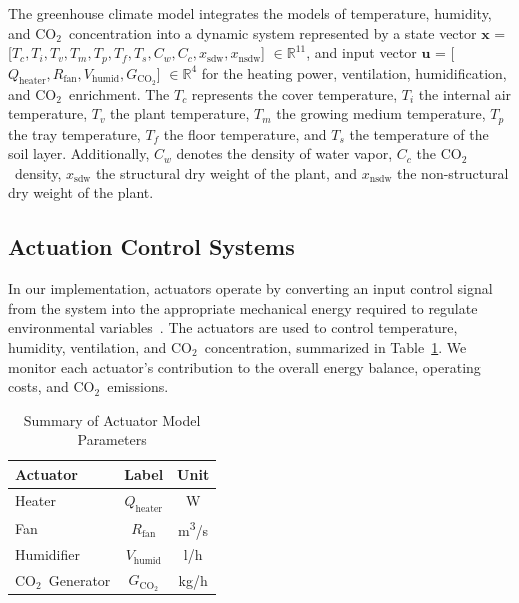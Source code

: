 \documentclass[conference]{IEEEtran}
\newcommand{\coo}{\ensuremath{\mathrm{CO_2}}}
\begin{document}
The greenhouse climate model integrates the models of temperature, humidity, and \coo\ concentration into a dynamic system represented by a state vector \(\mathbf{x}\) = [\(T_c, T_i, T_v, T_m, T_p, T_f, T_s, C_w, C_c, x_{\text{sdw}}, x_{\text{nsdw}}\)] \( \in\mathbb R^{11} \), and input vector \(\mathbf{u}\) = [\(Q_{\text{heater}}, R_{\text{fan}}, V_{\text{humid}}, G_{\coo} \)] \( \in\mathbb R^{4} \) for the heating power, ventilation, humidification, and \coo\ enrichment. The \(T_c\) represents the cover temperature, \(T_i\) the internal air temperature, \(T_v\) the plant temperature, \(T_m\) the growing medium temperature, \(T_p\) the tray temperature, \(T_f\) the floor temperature, and \(T_s\) the temperature of the soil layer. Additionally, \(C_w\) denotes the density of water vapor, \(C_c\) the \coo\ density, \(x_{\text{sdw}}\) the structural dry weight of the plant, and \(x_{\text{nsdw}}\) the non-structural dry weight of the plant.

\subsection{Actuation Control Systems}
In our implementation, actuators operate by converting an input control signal from the system into the appropriate mechanical energy required to regulate environmental variables~\cite{Butterfield2018}. The actuators are used to control temperature, humidity, ventilation, and \coo\ concentration, summarized in Table~\ref{tab:actuators}. We monitor each actuator's contribution to the overall energy balance, operating costs, and \coo\ emissions.

\begin{table}
    \centering
    \caption{Summary of Actuator Model Parameters}\label{tab:actuators}
    \begin{tabular}{lcc}
        \toprule
        Actuator        & Label                   & Unit                   \\
        \midrule
        Heater          & \( Q_{\text{heater}} \) & W                      \\
        Fan             & \( R_{\text{fan}} \)    & m\textsuperscript{3}/s \\
        Humidifier      & \( V_{\text{humid}} \)  & l/h                    \\
        \coo\ Generator & \( G_{\coo} \)          & kg/h                   \\
        \bottomrule
    \end{tabular}
\end{table}
\end{document}
